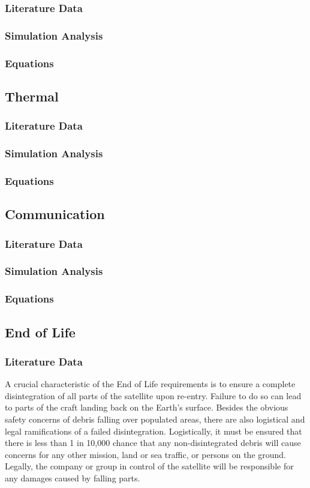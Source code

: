 \subsubsection{Literature Data}
\subsubsection{Simulation Analysis}
\subsubsection{Equations}

\subsection{Thermal}
\subsubsection{Literature Data}
\subsubsection{Simulation Analysis}
\subsubsection{Equations}

\subsection{Communication}
\subsubsection{Literature Data}
\subsubsection{Simulation Analysis}
\subsubsection{Equations}

\subsection{End of Life}
\subsubsection{Literature Data}
A crucial characteristic of the End of Life requirements is to ensure a complete disintegration of all parts of the satellite upon re-entry. Failure to do so can lead to parts of the craft landing back on the Earth's surface. Besides the obvious safety concerns of debris falling over populated areas, there are also logistical and legal ramifications of a failed disintegration. Logistically, it must be ensured that there is less than 1 in 10,000 chance that any non-disintegrated debris will cause concerns for any other mission, land or sea traffic, or persons on the ground. Legally, the company or group in control of the satellite will be responsible for any damages caused by falling parts. 

